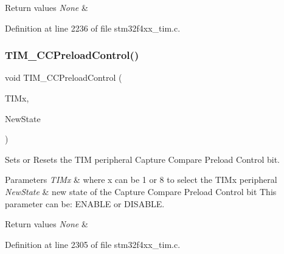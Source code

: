 \begin{DoxyRetVals}{Return values}
{\em None} & \\
\hline
\end{DoxyRetVals}


Definition at line 2236 of file stm32f4xx\+\_\+tim.\+c.

\mbox{\label{group___t_i_m_ga0a935254e44312b1d78e8684a58db3c1}} 
\subsubsection{\texorpdfstring{T\+I\+M\+\_\+\+C\+C\+Preload\+Control()}{TIM\_CCPreloadControl()}}
{\footnotesize\ttfamily void T\+I\+M\+\_\+\+C\+C\+Preload\+Control (\begin{DoxyParamCaption}\item[{\hyperlink{struct_t_i_m___type_def}{T\+I\+M\+\_\+\+Type\+Def} $\ast$}]{T\+I\+Mx,  }\item[{Functional\+State}]{New\+State }\end{DoxyParamCaption})}



Sets or Resets the T\+IM peripheral Capture Compare Preload Control bit. 


\begin{DoxyParams}{Parameters}
{\em T\+I\+Mx} & where x can be 1 or 8 to select the T\+I\+Mx peripheral \\
\hline
{\em New\+State} & new state of the Capture Compare Preload Control bit This parameter can be\+: E\+N\+A\+B\+LE or D\+I\+S\+A\+B\+LE. \\
\hline
\end{DoxyParams}

\begin{DoxyRetVals}{Return values}
{\em None} & \\
\hline
\end{DoxyRetVals}


Definition at line 2305 of file stm32f4xx\+\_\+tim.\+c.

\mbox{\label{group___t_i_m_ga3ecc4647d9ede261beb5e0535cf29ebb}} 
